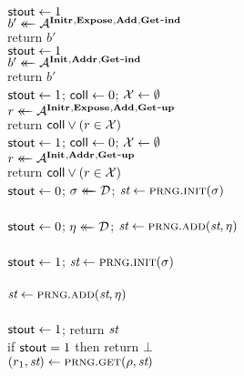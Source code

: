 \begin{figure}[t]
  \newcommand{\coll}{\flagfont{coll}}
  {
    \\[2pt]
      $\stout \gets \true$\\
      $b' \getsr \advA^{\INITRO,\EXPO,\ADDO,\GETINDO}$\\
      return $b'$
  }
  {
    \\[2pt]
      $\stout \gets \true$\\
      $b' \getsr \advA^{\INITO,\ADDRO,\GETINDO}$\\
      return $b'$
  }
  {
    \experimentv{$\Exp{\upfwd}_\prng(\advA)$}\\[2pt]
      $\stout \gets \true$; $\coll \gets \false$;
      $\setX \gets \emptyset$\\
      $\coins \getsr \advA^{\INITRO,\EXPO,\ADDO,\GETUPO}$\\
      return $\coll \OR (\coins \in \setX)$
  }
  {
    \experimentv{$\Exp{\upbwd}_\prng(\advA)$}\\[2pt]
      $\stout \gets \true$; $\coll \gets \false$;
      $\setX \gets \emptyset$\\
      $\coins \getsr \advA^{\INITO,\ADDRO,\GETUPO}$\\
      return $\coll \OR (\coins \in \setX)$
  }
  {
    \oraclev{$\INITRO(\dist)$}\\[2pt]
      $\stout \gets \false$;
      $\stsel \getsr \dist$;
      $\st \gets \prng.\init(\stsel)$
    \\[6pt]
    \oraclev{$\ADDRO(\dist)$}\\[2pt]
      $\stout \gets \false$;
      $\sel \getsr \dist$;
      $\st \gets \prng.\add(\st, \sel)$
    \\[6pt]
    \oraclev{$\INITO(\stsel)$}\\[2pt]
      $\stout \gets \true$;
      $\st \gets \prng.\init(\stsel)$
    \\[6pt]
    \oraclev{$\ADDO(\sel)$}\\[2pt]
      $\st \gets \prng.\add(\st, \sel)$
    \\[6pt]
    \oraclev{$\EXPO(\,)$}\\[2pt]
      $\stout \gets \true$;
      return $\st$
  }
  {
    \oraclev{$\GETINDO(\coinslen)$}\\[2pt]
      if $\stout = \true$ then return $\bot$\\
      $(\coins_1, \st) \gets \prng.\get(\coinslen, \st)$\\
}
\end{figure}
